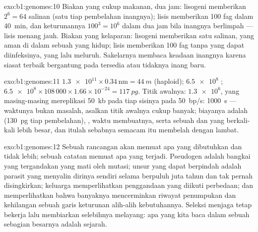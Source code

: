 \begin{solution}{exo:b1:genomes:10}
Biakan yang cukup makanan, dua jam: lisogeni memberikan $2^6 = 64$
salinan (satu tiap pembelahan inangnya); lisis memberikan 100 fag dalam
\qty{40}{min}, dan keturunannya $100^3 = 10^6$ dalam dua jam bila
inangnya berlimpah --- lisis menang jauh. Biakan yang kelaparan:
lisogeni memberikan satu salinan, yang aman di dalam sebuah  yang
hidup; lisis memberikan 100 fag tanpa  yang dapat diinfeksinya, yang
lalu meluruh. Sakelarnya membaca keadaan inangnya karena siasat terbaik
bergantung pada tersedia atau tidaknya inang baru.
\end{solution}

\begin{solution}{exo:b1:genomes:11}
$\num{1.3e11}\times 0.34\,\mathrm{nm} = \qty{44}{m}$ (haploid);
$\num{6.5e8}$ ;  $\num{6.5e8}\times 108\,000\times
1.66\times 10^{-24} = \qty{117}{pg}$. Titik awalnya: $\num{1.3e6}$,
yang masing-masing mereplikasi \qty{50}{kb} pada tiap sisinya pada
\qty{50}{bp/s}: \qty{1000}{s} --- waktunya bukan masalah, asalkan titik
awalnya cukup banyak; biayanya adalah  (\qty{130}{pg} 
tiap pembelahan), , waktu membuatnya, serta sebuah  dan 
yang berkali-kali lebih besar, dan itulah sebabnya  semacam itu
membelah dengan lambat.
\end{solution}

\begin{solution}{exo:b1:genomes:12}
Sebuah rancangan akan memuat apa yang dibutuhkan dan tidak lebih;
sebuah catatan memuat apa yang terjadi. Pseudogen adalah bangkai 
yang tergandakan yang mati oleh mutasi; unsur yang dapat berpindah
adalah parasit yang menyalin dirinya sendiri selama berpuluh juta tahun
dan tak pernah disingkirkan; keluarga  memperlihatkan penggandaan
yang diikuti perbedaan; dan  memperlihatkan bahwa
banyaknya  mencerminkan riwayat penumpukan dan kehilangan sebuah
garis keturunan alih-alih kebutuhannya. Seleksi menjaga  tetap
bekerja lalu membiarkan selebihnya melayang: apa yang kita baca dalam
sebuah  sebagian besarnya adalah sejarah.
\end{solution}

